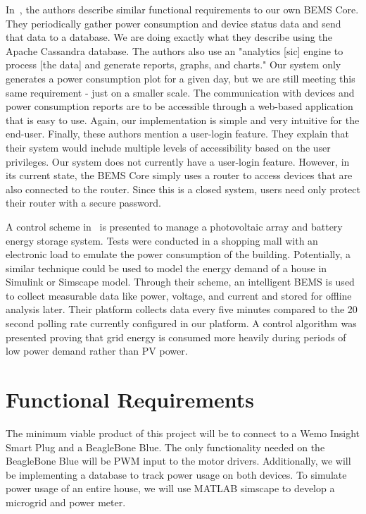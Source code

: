 \documentclass[letterpaper,12pt]{article}   %
\begin{document}
In~\cite{8246800}, the authors describe similar functional requirements to our own BEMS Core. They periodically gather power consumption and device status data and send that data to a database. We are doing exactly what they describe using the Apache Cassandra database. The authors also use an "analytics [sic] engine to process [the data] and generate reports, graphs, and charts." Our system only generates a power consumption plot for a given day, but we are still meeting this same requirement - just on a smaller scale. The communication with devices and power consumption reports are to be accessible through a web-based application that is easy to use. Again, our implementation is simple and very intuitive for the end-user. Finally, these authors mention a user-login feature. They explain that their system would include multiple levels of accessibility based on the user privileges. Our system does not currently have a user-login feature. However, in its current state, the BEMS Core simply uses a router to access devices that are also connected to the router. Since this is a closed system, users need only protect their router with a secure password.

A control scheme in~\cite{Barchi2018} is presented to manage a photovoltaic array and battery energy storage system. Tests were conducted in a shopping mall with an electronic load to emulate the power consumption of the building. Potentially, a similar technique could be used to model the energy demand of a house in Simulink or Simscape model. Through their scheme, an intelligent BEMS is used to collect measurable data like power, voltage, and current and stored for offline analysis later. Their platform collects data every five minutes compared to the 20 second polling rate currently configured in our platform. A control algorithm was presented proving that grid energy is consumed more heavily during periods of low power demand rather than PV power.

\section{Functional Requirements}
The minimum viable product of this project will be to connect to a Wemo Insight Smart Plug and a BeagleBone Blue. The only functionality needed on the BeagleBone Blue will be PWM input to the motor drivers. Additionally, we will be implementing a database to track power usage on both devices. To simulate power usage of an entire house, we will use MATLAB simscape to develop a microgrid and power meter.
\end{document}
